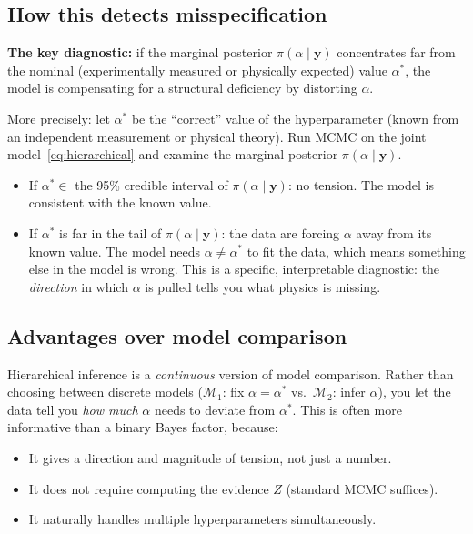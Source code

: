 \documentclass[11pt]{article}
\newcommand{\cM}{\mathcal{M}}
\theoremstyle{plain}
\theoremstyle{remark}
\theoremstyle{definition}
\begin{document}
\subsection{How this detects misspecification}

\textbf{The key diagnostic:} if the marginal posterior 
$\pi(\alpha \mid \mathbf{y})$ concentrates far from the nominal 
(experimentally measured or physically expected) value $\alpha^*$, the model 
is compensating for a structural deficiency by distorting $\alpha$.

More precisely: let $\alpha^*$ be the ``correct'' value of the 
hyperparameter (known from an independent measurement or physical theory). 
Run MCMC on the joint model~\eqref{eq:hierarchical} and examine the 
marginal posterior $\pi(\alpha \mid \mathbf{y})$.
\begin{itemize}
\item If $\alpha^* \in$ the 95\% credible interval of 
  $\pi(\alpha \mid \mathbf{y})$: no tension. The model is consistent with the 
  known value.
\item If $\alpha^*$ is far in the tail of $\pi(\alpha \mid \mathbf{y})$: 
  the data are forcing $\alpha$ away from its known value. The model needs 
  $\alpha \neq \alpha^*$ to fit the data, which means something else in the 
  model is wrong. This is a specific, interpretable diagnostic: the \emph{direction} 
  in which $\alpha$ is pulled tells you what physics is missing.
\end{itemize}

\subsection{Advantages over model comparison}

Hierarchical inference is a \emph{continuous} version of model comparison. 
Rather than choosing between discrete models ($\cM_1$: fix $\alpha = \alpha^*$ 
vs.\ $\cM_2$: infer $\alpha$), you let the data tell you \emph{how much} 
$\alpha$ needs to deviate from $\alpha^*$. This is often more informative 
than a binary Bayes factor, because:
\begin{itemize}
\item It gives a direction and magnitude of tension, not just a number.
\item It does not require computing the evidence $Z$ (standard MCMC suffices).
\item It naturally handles multiple hyperparameters simultaneously.
\end{itemize}
\end{document}
